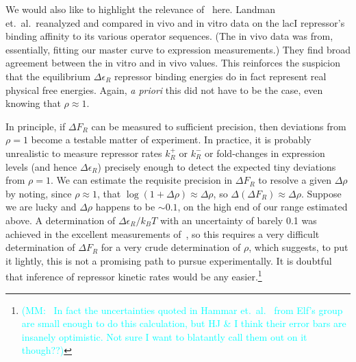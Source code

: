 \documentclass[12pt]{article}%
\newcommand{\mmnote}[1]{\textcolor{cyan}{(MM:~#1)}}
\begin{document}
We would also like to highlight the relevance
of~\cite{Landman2019} here. Landman et.\ al.\ reanalyzed and
compared in vivo and in vitro data on the lacI repressor's
binding affinity to its various operator sequences. (The in vivo
data was from, essentially, fitting our master curve to
expression measurements.) They find broad agreement between the
in vitro and in vivo values. This reinforces the suspicion that
the equilibrium $\Delta\epsilon_R$ repressor binding energies do
in fact represent real physical free energies.
Again, \textit{a priori} this did not have to be the case, even
knowing that $\rho\approx1$.

In principle, if $\Delta F_R$ can be measured to sufficient
precision, then deviations from $\rho=1$ become a
testable matter of experiment.
In practice, it is probably unrealistic to measure repressor
rates $k_R^+$ or $k_R^-$ or fold-changes in expression levels
(and hence $\Delta\epsilon_R$) precisely enough to detect the
expected tiny deviations from $\rho=1$.
We can estimate the
requisite precision in $\Delta F_R$ to resolve a given
$\Delta\rho$ by noting, since $\rho\approx1$, that
$\log(1+\Delta\rho)\approx \Delta\rho$, so
$\Delta(\Delta F_R) \approx \Delta\rho$.
Suppose we are lucky and $\Delta\rho$ happens to be $\sim0.1$, on
the high end of our range estimated above.
A determination of $\Delta\epsilon_R/k_BT$ with an uncertainty of
barely 0.1 was achieved in the excellent measurements
of~\cite{Razo-Mejia2018}, so this requires a very difficult
determination of $\Delta F_R$ for a very crude determination of $\rho$,
which suggests, to put it lightly, this is not a
promising path to pursue experimentally.
It is doubtful that inference of repressor kinetic rates
would be any easier.\footnote{
\mmnote{
In fact the uncertainties quoted in Hammar et.\
al.~\cite{Hammar2014} from Elf's group are small enough to do
this calculation, but HJ \& I think their error bars are insanely
optimistic. Not sure I want to blatantly call them out on it though??}
}
\end{document}
